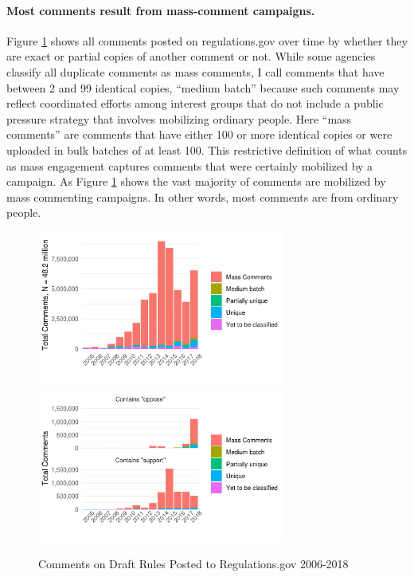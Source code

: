 

\paragraph{Most comments result from mass-comment campaigns.}
Figure \ref{fig:comments-support} shows all comments posted on regulations.gov over time by whether they are exact or partial copies of another comment or not. While some agencies classify all duplicate comments as mass comments, I call comments that have between 2 and 99 identical copies, ``medium batch'' because such comments may reflect coordinated efforts among interest groups that do not include a public pressure strategy that involves mobilizing ordinary people. Here ``mass comments'' are comments that have either 100 or more identical copies or were uploaded in bulk batches of at least 100. This restrictive definition of what counts as mass engagement captures comments that were certainly mobilized by a campaign. As Figure \ref{fig:comments-support} shows the vast majority of comments are mobilized by mass commenting campaigns. In other words, most comments are from ordinary people.

\begin{figure}
    \centering
        \caption{Comments on Draft Rules Posted to Regulations.gov 2006-2018}
    \includegraphics[height =2in]{Figs/comments-mass-1.png}
    \includegraphics[height =2in]{Figs/comments-mass-support-vs-oppose-1.png}

    \label{fig:comments-support}
\end{figure}

